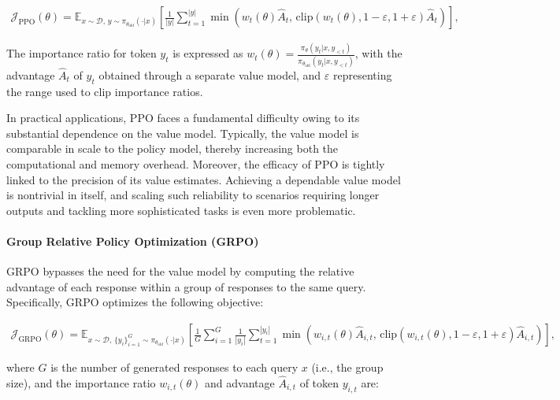 \begin{align}
\mathcal{J}_\text{PPO}(\theta) = \mathbb{E}_{ x \sim \mathcal{D},\, y \sim \pi_{\theta_\text{old}}( \cdot | x) }
\left[ \frac{1}{|y|} \sum_{t=1}^{|y|} 
\min \left( w_{t}(\theta) \widehat{A}_{t},  \, \mathrm{clip} \left( w_{t}(\theta), 1 - {\varepsilon}, 1 + {\varepsilon}\right) \widehat{A}_{t} \right)
\right],
\end{align}

The importance ratio for token $y_t$ is expressed as $
w_{t}(\theta) = \frac{ \pi_{\theta} (y_{t} | x, y_{<t}) }{ \pi_{\theta_\text{old}} (y_{t} | x,y_{<t})} $, with the advantage $\widehat{A}_{t}$ of $y_t$ obtained through a separate value model, and $\varepsilon$ representing the range used to clip importance ratios.

In practical applications, PPO faces a fundamental difficulty owing to its substantial dependence on the value model. Typically, the value model is comparable in scale to the policy model, thereby increasing both the computational and memory overhead. Moreover, the efficacy of PPO is tightly linked to the precision of its value estimates. Achieving a dependable value model is nontrivial in itself, and scaling such reliability to scenarios requiring longer outputs and tackling more sophisticated tasks is even more problematic.

\paragraph{Group Relative Policy Optimization (GRPO)} GRPO \citep{grpo} bypasses the need for the value model by computing the relative advantage of each response within a group of responses to the same query. Specifically, GRPO optimizes the following objective:

\begin{align}
\label{equ:grpo}
\mathcal{J}_\text{GRPO}(\theta) = \mathbb{E}_{ x \sim \mathcal{D},\, \{y_i\}_{i=1}^G \sim \pi_{\theta_\text{old}}( \cdot | x) }
\left[ \frac{1}{G} \sum_{i=1}^{G} \frac{1}{|y_i|} \sum_{t=1}^{|y_i|} 
\min \left( w_{i,t}(\theta) \widehat{A}_{i,t},  \, \mathrm{clip} \left( w_{i,t}(\theta), 1 - {\varepsilon}, 1 + {\varepsilon}\right) \widehat{A}_{i,t} \right)
\right],
\end{align}

where $G$ is the number of generated responses to each query $x$ (i.e., the group size), and the importance ratio $w_{i,t}(\theta)$ and advantage $\widehat{A}_{i,t}$ of token $y_{i,t}$ are:

